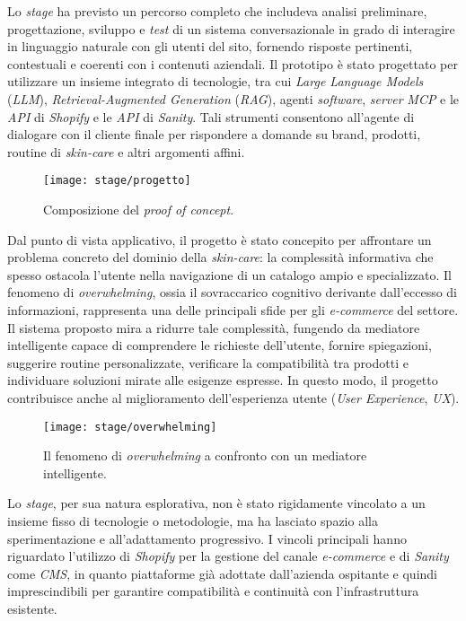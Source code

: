 Lo \emph{stage} ha previsto un percorso completo che includeva analisi preliminare, progettazione, sviluppo e \emph{test} di un sistema conversazionale in grado di 
interagire in linguaggio naturale con gli utenti del sito, fornendo risposte pertinenti, contestuali e coerenti con i contenuti aziendali. 
Il prototipo è stato progettato per utilizzare un insieme integrato di tecnologie, tra cui \emph{Large Language Models} (\emph{LLM}), \emph{Retrieval-Augmented Generation} (\emph{RAG}), 
agenti \emph{software}, \emph{server} \emph{MCP} e le \emph{API} di \emph{Shopify} e le \emph{API} di \emph{Sanity}. 
Tali strumenti consentono all’agente di dialogare con il cliente finale per rispondere a domande su brand, prodotti, routine di \emph{skin-care} e altri argomenti affini.
\begin{figure}[htbp]
    \centering
    \texttt{[image: stage/progetto]}
    \caption{Composizione del \emph{proof of concept}.}
    \label{fig:progetto}
  \end{figure}
Dal punto di vista applicativo, il progetto è stato concepito per affrontare un problema concreto del dominio della \emph{skin-care}: la complessità informativa 
che spesso ostacola l’utente nella navigazione di un catalogo ampio e specializzato. 
Il fenomeno di \emph{overwhelming}, ossia il sovraccarico cognitivo derivante dall’eccesso di informazioni, rappresenta una delle principali sfide per gli \emph{e-commerce} del settore. 
Il sistema proposto mira a ridurre tale complessità, fungendo da mediatore intelligente capace di comprendere le richieste dell’utente, fornire spiegazioni, suggerire routine personalizzate, 
verificare la compatibilità tra prodotti e individuare soluzioni mirate alle esigenze espresse. 
In questo modo, il progetto contribuisce anche al miglioramento dell’esperienza utente (\emph{User Experience}, \emph{UX}).
\begin{figure}[htbp]
    \centering
    \texttt{[image: stage/overwhelming]}
    \caption{Il fenomeno di \emph{overwhelming} a confronto con un mediatore intelligente.}
    \label{fig:overwhelming}
  \end{figure}
Lo \emph{stage}, per sua natura esplorativa, non è stato rigidamente vincolato a un insieme fisso di tecnologie o metodologie, ma ha lasciato spazio alla 
sperimentazione e all’adattamento progressivo. 
I vincoli principali hanno riguardato l’utilizzo di \emph{Shopify} per la gestione del canale \emph{e-commerce} e di \emph{Sanity} 
come \emph{CMS}, in quanto piattaforme già adottate dall’azienda ospitante e quindi imprescindibili per garantire compatibilità e continuità con l’infrastruttura esistente.

